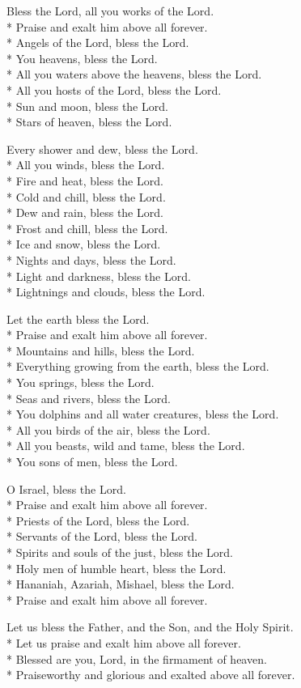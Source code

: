  Bless the Lord, all you works of the Lord. \\*
 Praise and exalt him above all forever. \\*
Angels of the Lord, bless the Lord. \\*
You heavens, bless the Lord. \\*
All you waters above the heavens, bless the Lord. \\*
All you hosts of the Lord, bless the Lord. \\*
Sun and moon, bless the Lord. \\*
Stars of heaven, bless the Lord.

 Every shower and dew, bless the Lord. \\*
All you winds, bless the Lord. \\*
Fire and heat, bless the Lord. \\*
Cold and chill, bless the Lord. \\*
Dew and rain, bless the Lord. \\*
Frost and chill, bless the Lord. \\*
Ice and snow, bless the Lord. \\*
Nights and days, bless the Lord. \\*
Light and darkness, bless the Lord. \\*
Lightnings and clouds, bless the Lord.

 Let the earth bless the Lord. \\*
Praise and exalt him above all forever. \\*
Mountains and hills, bless the Lord. \\*
Everything growing from the earth, bless the Lord. \\*
You springs, bless the Lord. \\*
Seas and rivers, bless the Lord. \\*
You dolphins and all water creatures, bless the Lord. \\*
All you birds of the air, bless the Lord. \\*
All you beasts, wild and tame, bless the Lord. \\*
You sons of men, bless the Lord.

 O Israel, bless the Lord. \\*
Praise and exalt him above all forever. \\*
Priests of the Lord, bless the Lord. \\*
Servants of the Lord, bless the Lord. \\*
Spirits and souls of the just, bless the Lord. \\*
Holy men of humble heart, bless the Lord. \\*
Hananiah, Azariah, Mishael, bless the Lord. \\*
Praise and exalt him above all forever.

 Let us bless the Father, and the Son, and the Holy Spirit. \\*
Let us praise and exalt him above all forever. \\*
 Blessed are you, Lord, in the firmament of heaven. \\*
Praiseworthy and glorious and exalted above all forever.